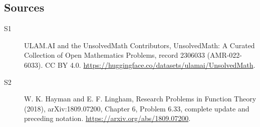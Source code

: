 \documentclass[11pt]{article}
\begin{document}
\subsection{Sources}
\begin{description}
\item[\hypertarget{source:2306033:1}{S1}] ULAM.AI and the UnsolvedMath Contributors, UnsolvedMath: A Curated Collection of Open Mathematics Problems, record 2306033 (AMR-022-6033). CC BY 4.0. \url{https://huggingface.co/datasets/ulamai/UnsolvedMath}.
\item[\hypertarget{source:2306033:2}{S2}] W. K. Hayman and E. F. Lingham, Research Problems in Function Theory (2018), arXiv:1809.07200, Chapter 6, Problem 6.33, complete update and preceding notation. \url{https://arxiv.org/abs/1809.07200}.
\end{description}
\label{end:2306033}
\end{document}

